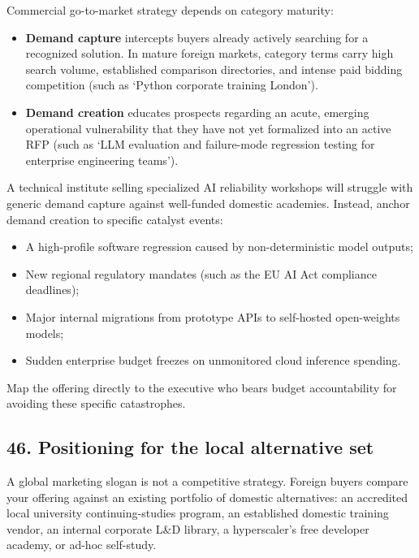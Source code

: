 Commercial go-to-market strategy depends on category maturity:
\begin{itemize}
    \item \textbf{Demand capture} intercepts buyers already actively searching for a recognized solution. In mature foreign markets, category terms carry high search volume, established comparison directories, and intense paid bidding competition (such as `Python corporate training London').
    \item \textbf{Demand creation} educates prospects regarding an acute, emerging operational vulnerability that they have not yet formalized into an active RFP (such as `LLM evaluation and failure-mode regression testing for enterprise engineering teams').
\end{itemize}

A technical institute selling specialized AI reliability workshops will struggle with generic demand capture against well-funded domestic academies. Instead, anchor demand creation to specific catalyst events:
\begin{itemize}
    \item A high-profile software regression caused by non-deterministic model outputs;
    \item New regional regulatory mandates (such as the EU AI Act compliance deadlines);
    \item Major internal migrations from prototype APIs to self-hosted open-weights models;
    \item Sudden enterprise budget freezes on unmonitored cloud inference spending.
\end{itemize}
Map the offering directly to the executive who bears budget accountability for avoiding these specific catastrophes.

\subsection{46. Positioning for the local alternative set}

A global marketing slogan is not a competitive strategy. Foreign buyers compare your offering against an existing portfolio of domestic alternatives: an accredited local university continuing-studies program, an established domestic training vendor, an internal corporate L\&D library, a hyperscaler's free developer academy, or ad-hoc self-study.

